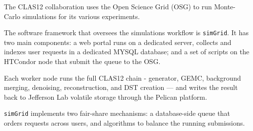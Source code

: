%





\pagestyle{fancy}
\fancyhf{}
\renewcommand{\headrulewidth}{0.4pt}
\renewcommand{\sectionmark}[1]{\markright{\thesection.\ #1}}
\fancyhead[R]{\footnotesize\slshape \rightmark}
\fancyfoot[C]{\small\thepage}


\thispagestyle{plain}
\vspace{18pt}
\vspace{8pt}
\vspace{6pt}


\begin{noteabstract}

The CLAS12 collaboration uses the Open Science Grid (OSG) to run Monte-Carlo simulations
for its various experiments.

The software framework that oversees the simulations workflow is \texttt{simGrid}.
It has two main components: a web portal runs on a dedicated server, collects and indexes
user requests in a dedicated MYSQL database; and a set of scripts on the HTCondor node that
submit the queue to the OSG\@.

Each worker node runs the full CLAS12 chain - generator, GEMC, background merging,
denoising, reconstruction, and DST creation --- and writes the
result back to Jefferson Lab volatile storage through the Pelican platform.

\texttt{simGrid} implements two fair-share mechanisms: a database-side queue that orders
requests across users, and algorithms to balance the running submissions.

\end{noteabstract}

